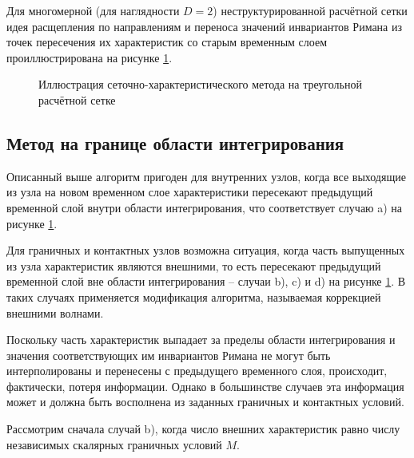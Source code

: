 \documentclass[a4paper]{article}
\numberwithin{equation}{section}
\begin{document}
Для многомерной (для наглядности $D = 2$) неструктурированной расчётной сетки 
идея расщепления по направлениям и переноса значений инвариантов Римана 
из точек пересечения их характеристик со старым временным слоем 
проиллюстрирована на рисунке \ref{pic:gcm-on-triangles}.
\begin{figure}[H]
	\caption{Иллюстрация сеточно-характеристического метода на треугольной расчётной сетке}
	\label{pic:gcm-on-triangles}
\end{figure}


\subsection{Метод на границе области интегрирования}
Описанный выше алгоритм пригоден для внутренних узлов, когда все выходящие 
из узла на новом временном слое характеристики пересекают предыдущий временной слой 
внутри области интегрирования, что соответствует случаю a) на рисунке \ref{pic:gcm-on-triangles}.

Для граничных и контактных узлов возможна ситуация, 
когда часть выпущенных из узла характеристик являются внешними, то есть
пересекают предыдущий временной слой вне области интегрирования -- 
случаи b), c) и d) на рисунке \ref{pic:gcm-on-triangles}. 
В таких случаях применяется модификация алгоритма, 
называемая коррекцией внешними волнами. 

Поскольку часть характеристик выпадает за пределы области интегрирования 
и значения соответствующих им инвариантов Римана не могут быть интерполированы
и перенесены с предыдущего временного слоя, происходит, фактически, потеря информации. 
Однако в большинстве случаев эта информация может и должна быть восполнена
из заданных граничных и контактных условий.

Рассмотрим сначала случай b), когда число внешних характеристик 
равно числу независимых скалярных граничных условий $M$.
\end{document}
